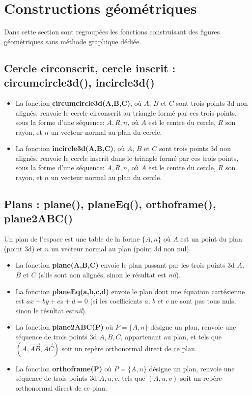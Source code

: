 \section{Constructions géométriques}

Dans cette section sont regroupées les fonctions construisant des figures géométriques sans méthode graphique dédiée.

\subsection{Cercle circonscrit, cercle inscrit : circumcircle3d(), incircle3d()}

\begin{itemize}
    \item La fonction \textbf{circumcircle3d(A,B,C)}, où $A$, $B$ et $C$ sont trois points 3d non alignés, renvoie le cercle circonscrit au triangle formé par ces trois points, sous la forme d'une séquence: $A,R,n$, où $A$ est le centre du cercle, $R$ son rayon, et $n$ un vecteur normal au plan du cercle.
    \item La fonction \textbf{incircle3d(A,B,C)}, où $A$, $B$ et $C$ sont trois points 3d non alignés, renvoie le cercle inscrit dans le triangle formé par ces trois points, sous la forme d'une séquence: $A,R,n$, où $A$ est le centre du cercle, $R$ son rayon, et $n$ un vecteur normal au plan du cercle.    
\end{itemize}

\subsection{Plans : plane(), planeEq(), orthoframe(), plane2ABC()}

Un plan de l'espace est une table de la forme $\{A,n\}$ où $A$ est un point du plan (point 3d) et $n$ un vecteur normal au plan (point 3d non nul).
\begin{itemize}
    \item La fonction \textbf{plane(A,B,C)} envoie le plan passant par les trois points 3d $A$, $B$ et $C$ (s'ils sont non alignés, sinon le résultat est \emph{nil}).
    \item La fonction \textbf{planeEq(a,b,c,d)} envoie le plan dont une équation cartésienne est $ax+by+cz+d=0$ (si les coefficients $a$, $b$ et $c$ ne sont pas tous nuls, sinon le résultat est\emph{nil}).
    \item La fonction \textbf{plane2ABC(P)} où $P=\{A,n\}$ désigne un plan, renvoie une séquence de trois points 3d $A,B,C$, appartenant au plan, et tels que $(A,\vec{AB},\vec{AC})$ soit un repère orthonormal direct de ce plan.
    \item La fonction \textbf{orthoframe(P)} où $P=\{A,n\}$ désigne un plan, renvoie une séquence de trois points 3d $A,u,v$, tels que $(A,u,v)$ soit un repère orthonormal direct de ce plan.
\end{itemize}

